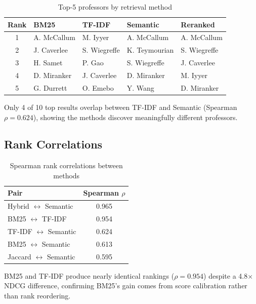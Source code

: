 \documentclass[11pt,a4paper]{article}
\begin{document}
\begin{table}[H]
\centering
\caption{Top-5 professors by retrieval method}
\label{tab:top5}
\begin{tabular}{cllll}
\toprule
\textbf{Rank} & \textbf{BM25} & \textbf{TF-IDF} &
\textbf{Semantic} & \textbf{Reranked} \\
\midrule
1 & A. McCallum    & M. Iyyer       & A. McCallum     & A. McCallum    \\
2 & J. Caverlee    & S. Wiegreffe   & K. Teymourian   & S. Wiegreffe   \\
3 & H. Samet       & P. Gao         & S. Wiegreffe    & J. Caverlee    \\
4 & D. Miranker    & J. Caverlee    & D. Miranker     & M. Iyyer       \\
5 & G. Durrett     & O. Emebo       & Y. Wang         & D. Miranker    \\
\bottomrule
\end{tabular}
\end{table}

Only 4 of 10 top results overlap between TF-IDF and Semantic (Spearman
$\rho = 0.624$), showing the methods discover meaningfully different
professors.

\subsection{Rank Correlations}

\begin{table}[H]
\centering
\caption{Spearman rank correlations between methods}
\label{tab:correlations}
\begin{tabular}{lc}
\toprule
\textbf{Pair} & \textbf{Spearman $\rho$} \\
\midrule
Hybrid $\leftrightarrow$ Semantic  & 0.965 \\
BM25 $\leftrightarrow$ TF-IDF      & 0.954 \\
TF-IDF $\leftrightarrow$ Semantic  & 0.624 \\
BM25 $\leftrightarrow$ Semantic    & 0.613 \\
Jaccard $\leftrightarrow$ Semantic & 0.595 \\
\bottomrule
\end{tabular}
\end{table}

BM25 and TF-IDF produce nearly identical rankings ($\rho = 0.954$) despite a
4.8$\times$ NDCG difference, confirming BM25's gain comes from score
calibration rather than rank reordering.
\end{document}
